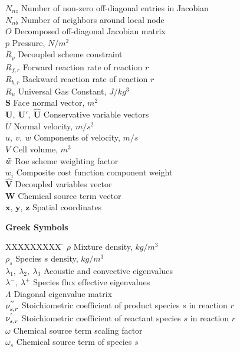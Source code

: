 \begin{tabbing}
  $N_{nz}$ \> Number of non-zero off-diagonal entries in Jacobian \\
  $N_{nb}$ \> Number of neighbors around local node \\
  $O$ \> Decomposed off-diagonal Jacobian matrix \\
  $p$ \> Pressure, $N/m^2$ \\
  $R_\rho$ \> Decoupled scheme constraint \\
  $R_{f,r}$ \> Forward reaction rate of reaction $r$ \\
  $R_{b,r}$ \> Backward reaction rate of reaction $r$ \\
  $R_u$ \> Universal Gas Constant, $J/kg^3$ \\
  $\mathbf{S}$ \> Face normal vector, $m^2$\\
  $\mathbf{U},\ \mathbf{U}',\ \mathbf{\hat{U}}$ \> Conservative variable vectors \\
  $\overline{U}$ \> Normal velocity, $m/s^2$ \\
  $u,\ v,\ w$ \> Components of velocity, $m/s$ \\
  $V$ \> Cell volume, $m^3$ \\
  $\tilde{w}$ \> Roe scheme weighting factor \\
  $w_i$ \> Composite cost function component weight \\
  $\mathbf{\hat{V}}$ \>  Decoupled variables vector \\
  $\mathbf{W}$ \> Chemical source term vector \\
  $\mathbf{x}$, $\mathbf{y}$, $\mathbf{z}$ \> Spatial coordinates \\
 \end{tabbing}

\textbf{Greek Symbols}
\begin{tabbing}
  XXXXXXXXX \= \kill%
  $\rho$ \> Mixture density, $kg/m^3$ \\
  $\rho_s$ \> Species $s$ density, $kg/m^3$ \\
  $\lambda_1,\ \lambda_2,\ \lambda_3$ \> Acoustic and convective eigenvalues \\
  $\lambda^-,\ \lambda^+$ \> Species flux effective eigenvalues \\
  $\Lambda$ \> Diagonal eigenvalue matrix \\
  $\nu_{s,r}^{''}$ \> Stoichiometric coefficient of product species $s$ in reaction $r$ \\
  $\nu_{s,r}^{'}$ \> Stoichiometric coefficient of reactant species $s$ in reaction $r$ \\
  $\omega$ \> Chemical source term scaling factor \\
  $\omega_s$ \> Chemical source term of species $s$ \\
\end{tabbing}


